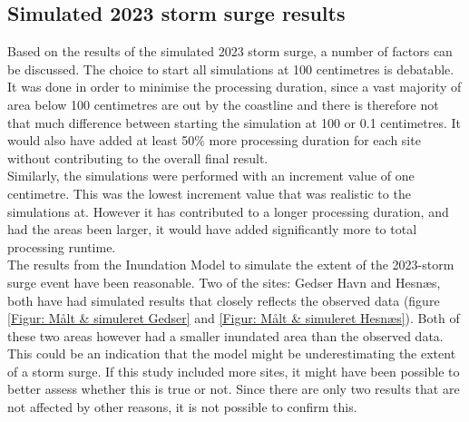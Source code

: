 \subsection{Simulated 2023 storm surge results}
Based on the results of the simulated 2023 storm surge, a number of factors can be discussed. The choice to start all simulations at 100 centimetres is debatable. It was done in order to minimise the processing duration, since a vast majority of area below 100 centimetres are out by the coastline and there is therefore not that much difference between starting the simulation at 100 or 0.1 centimetres. It would also have added at least 50\% more processing duration for each site without contributing to the overall final result.\\
Similarly, the simulations were performed with an increment value of one centimetre. This was the lowest increment value that was realistic to the simulations at. However it has contributed to a longer processing duration, and had the areas been larger, it would have added significantly more to total processing runtime.\\

The results from the Inundation Model to simulate the extent of the 2023-storm surge event have been reasonable. Two of the sites: Gedser Havn and Hesnæs, both have had simulated results that closely reflects the observed data (figure \ref{Figur: Målt & simuleret Gedser} and \ref{Figur: Målt & simuleret Hesnæs}). Both of these two areas however had a smaller inundated area than the observed data. This could be an indication that the model might be underestimating the extent of a storm surge. If this study included more sites, it might have been possible to better assess whether this is true or not. Since there are only two results that are not affected by other reasons, it is not possible to confirm this.\\

